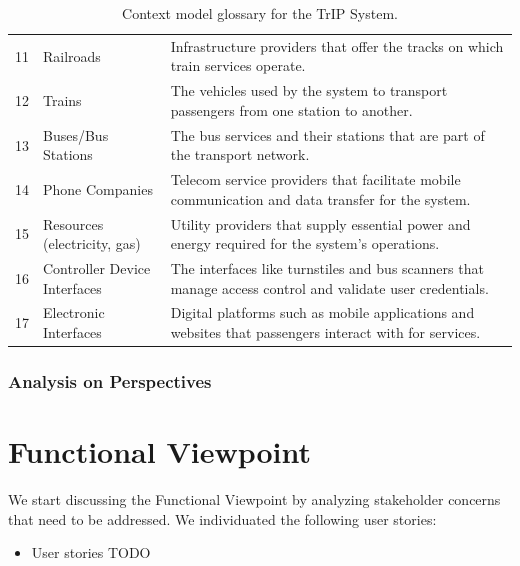 \begin{table}[H]
\begin{tabular}{@{}clp{9cm}@{}}
11 & Railroads & Infrastructure providers that offer the tracks on which train services operate. \\
12 & Trains & The vehicles used by the system to transport passengers from one station to another. \\
13 & Buses/Bus Stations & The bus services and their stations that are part of the transport network. \\
14 & Phone Companies & Telecom service providers that facilitate mobile communication and data transfer for the system. \\
15 & Resources (electricity, gas) & Utility providers that supply essential power and energy required for the system’s operations. \\
16 & Controller Device Interfaces & The interfaces like turnstiles and bus scanners that manage access control and validate user credentials. \\
17 & Electronic Interfaces & Digital platforms such as mobile applications and websites that passengers interact with for services. \\
\bottomrule
\end{tabular}
\caption{Context model glossary for the TrIP System.}
\label{tab:glossary_context_view}
\end{table}

\subsubsection{Analysis on Perspectives}

\section{Functional Viewpoint}

We start discussing the Functional Viewpoint by analyzing stakeholder concerns that need to be addressed.
We individuated the following user stories:
\begin{itemize}
    \item User stories TODO
\end{itemize}

